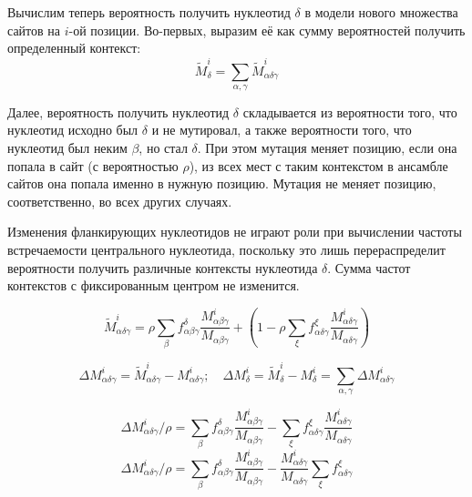 \documentclass[a4paper]{article}
\begin{document}
Вычислим теперь вероятность получить нуклеотид $\delta$ в модели нового множества сайтов на $i$-ой позиции. Во-первых, выразим её как сумму вероятностей получить определенный контекст:
\begin{equation*}
\widetilde{M}^i_{\delta} = \sum_{\alpha,\gamma}\widetilde{M}^i_{\alpha\delta\gamma}
\end{equation*}

Далее, вероятность получить нуклеотид $\delta$ складывается из вероятности того, что нуклеотид исходно был $\delta$ и не мутировал, а также вероятности того, что нуклеотид был неким $\beta$, но стал $\delta$. При этом мутация меняет позицию, если она попала в сайт (с вероятностью $\rho$), из всех мест с таким контекстом в ансамбле сайтов она попала именно в нужную позицию. Мутация не меняет позицию, соответственно, во всех других случаях.

Изменения фланкирующих нуклеотидов не играют роли при вычислении частоты встречаемости центрального нуклеотида, поскольку это лишь перераспределит вероятности получить различные контексты нуклеотида $\delta$. Сумма частот контекстов с фиксированным центром не изменится.

\begin{equation}
\widetilde{M}^i_{\alpha\delta\gamma} = \rho\sum_{\beta}f_{\alpha\beta\gamma}^{\delta}\frac{M^i_{\alpha\beta\gamma}}{M_{\alpha\beta\gamma}} + \left(1 - \rho\sum_{\xi}f_{\alpha\delta\gamma}^{\xi}\frac{M^i_{\alpha\delta\gamma}}{M_{\alpha\delta\gamma}}\right)
\end{equation}

\begin{equation*}
\Delta M^i_{\alpha\delta\gamma} = \widetilde{M}^i_{\alpha\delta\gamma} - M^i_{\alpha\delta\gamma}; \quad\Delta M^i_{\delta} = \widetilde{M}^i_{\delta} - M^i_{\delta} = \sum_{\alpha,\gamma}\Delta M^i_{\alpha\delta\gamma}
\end{equation*}

\begin{equation*}
\Delta M^i_{\alpha\delta\gamma}/\rho = \sum_{\beta}f_{\alpha\beta\gamma}^{\delta}\frac{M^i_{\alpha\beta\gamma}}{M_{\alpha\beta\gamma}} - \sum_{\xi}f_{\alpha\delta\gamma}^{\xi}\frac{M^i_{\alpha\delta\gamma}}{M_{\alpha\delta\gamma}}
\end{equation*}
\begin{equation*}
\Delta M^i_{\alpha\delta\gamma}/\rho = \sum_{\beta}f_{\alpha\beta\gamma}^{\delta}\frac{M^i_{\alpha\beta\gamma}}{M_{\alpha\beta\gamma}} - \frac{M^i_{\alpha\delta\gamma}}{M_{\alpha\delta\gamma}}\sum_{\xi}f_{\alpha\delta\gamma}^{\xi}
\end{equation*}
\end{document}
